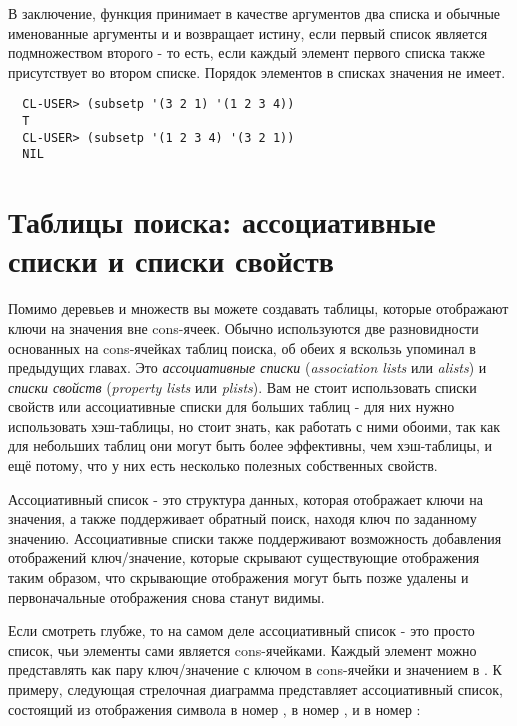 В заключение, функция  принимает в качестве аргументов два списка и обычные
именованные аргументы  и  и возвращает истину, если первый список
является подмножеством второго - то есть, если каждый элемент первого списка также
присутствует во втором списке.  Порядок элементов в списках значения не имеет.

\begin{verbatim}
  CL-USER> (subsetp '(3 2 1) '(1 2 3 4))
  T
  CL-USER> (subsetp '(1 2 3 4) '(3 2 1))
  NIL
\end{verbatim}


\section{Таблицы поиска: ассоциативные списки и списки свойств}

Помимо деревьев и множеств вы можете создавать таблицы, которые отображают ключи на
значения вне cons-ячеек. Обычно используются две разновидности основанных на cons-ячейках
таблиц поиска, об обеих я вскользь упоминал в предыдущих главах. Это \textit{ассоциативные
  списки} (\textit{association lists} или \textit{alists}) и \textit{списки свойств}
(\textit{property lists} или \textit{plists}). Вам не стоит использовать списки свойств
или ассоциативные списки для больших таблиц - для них нужно использовать хэш-таблицы, но
стоит знать, как работать с ними обоими, так как для небольших таблиц они могут быть более
эффективны, чем хэш-таблицы, и ещё потому, что у них есть несколько полезных собственных
свойств.
 
Ассоциативный список - это структура данных, которая отображает ключи на значения, а также
поддерживает обратный поиск, находя ключ по заданному значению. Ассоциативные списки также
поддерживают возможность добавления отображений ключ/значение, которые скрывают
существующие отображения таким образом, что скрывающие отображения могут быть позже
удалены и первоначальные отображения снова станут видимы.

Если смотреть глубже, то на самом деле ассоциативный список - это просто список, чьи
элементы сами является cons-ячейками. Каждый элемент можно представлять как пару
ключ/значение с ключом в  cons-ячейки и значением в . К примеру,
следующая стрелочная диаграмма представляет ассоциативный список, состоящий из отображения
символа  в номер ,  в номер , и  в номер :


